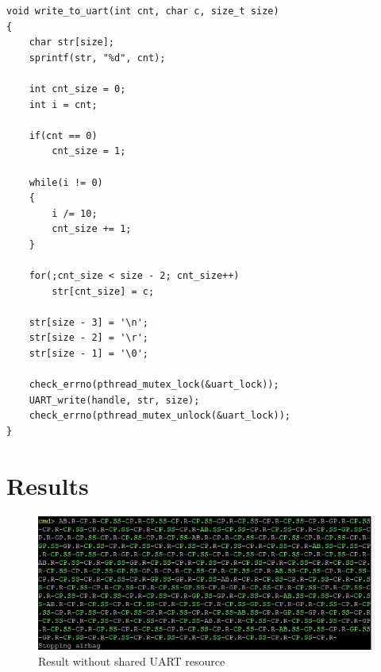 \documentclass[10pt]{article}
\begin{document}
\begin{lstlisting}[style=CStyle, caption={Write to UART implementation}, captionpos=b, label={lst:uart}, escapechar=@]
void write_to_uart(int cnt, char c, size_t size)
{
    char str[size];
    sprintf(str, "%d", cnt);

    int cnt_size = 0;
    int i = cnt;

    if(cnt == 0)
        cnt_size = 1;

    while(i != 0)
    {
        i /= 10;
        cnt_size += 1;
    }

    for(;cnt_size < size - 2; cnt_size++)
        str[cnt_size] = c;

    str[size - 3] = '\n';
    str[size - 2] = '\r';
    str[size - 1] = '\0';

    check_errno(pthread_mutex_lock(&uart_lock));
    UART_write(handle, str, size);
    check_errno(pthread_mutex_unlock(&uart_lock));
}
\end{lstlisting}

\newpage

\section*{Results}

\begin{figure}[H]
\caption{Result without shared UART resource}
\label{resNoUART}
\centering
\includegraphics[width=0.7\linewidth]{./images/result_no_uart.jpeg}
\end{figure}
\end{document}
